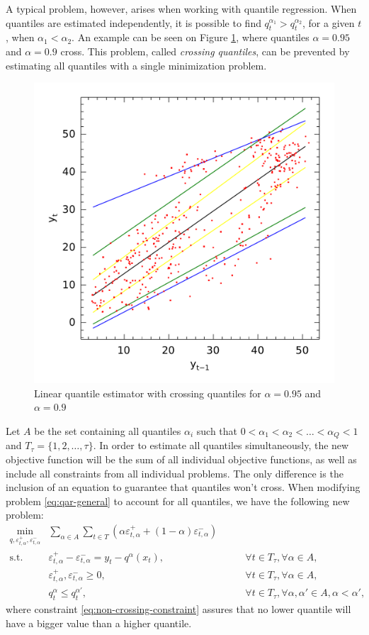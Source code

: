 A typical problem, however, arises when working with quantile regression. When quantiles are estimated independently, it is possible to find $q^{\alpha_1}_{t} > q^{\alpha_2}_{t}$, for a given $t$, when $\alpha_1 < \alpha_2$. An example can be seen on Figure \ref{fig:crossing-quantiles}, where quantiles $\alpha = 0.95$ and $\alpha = 0.9$ cross. This problem, called \textit{crossing quantiles}, can be prevented by estimating all quantiles with a single minimization problem.
\begin{figure}
	\centering
	\includegraphics[width=0.6\linewidth]{./Figuras/npqar/icaraizinho-crossing-200}
	\caption{Linear quantile estimator with crossing quantiles for $\alpha = 0.95$ and $\alpha = 0.9$}
	\label{fig:crossing-quantiles}
\end{figure}

Let $A$ be the set containing all quantiles $\alpha_i$ such that $0 < \alpha_1 < \alpha_2 < \dots < \alpha_Q < 1$ and $T_\tau = \{1, 2, \dots, \tau\}$. In order to estimate all quantiles simultaneously, the new objective function will be the sum of all individual objective functions, as well as include all constraints from all individual problems. The only difference is the inclusion of an equation to guarantee that quantiles won't cross. When modifying problem \ref{eq:qar-general} to account for all quantiles, we have the following new problem:
\begin{eqnarray}
\label{eq:non-crossing-quantiles1}
\min_{q,\varepsilon_{t,\alpha}^{+}, \varepsilon_{t,\alpha}^{-}} &  \sum_{\alpha \in A} \sum_{t \in T}\left(\alpha \varepsilon_{t,\alpha}^{+}+(1-\alpha)\varepsilon_{t,\alpha}^{-}\right) &  \\
\mbox{s.t. } & \varepsilon_{t,\alpha}^{+}-\varepsilon_{t,\alpha}^{-}=y_{t}-q^\alpha(x_{t}), & \qquad\forall t \in T_\tau,\forall \alpha \in A,\\
& \varepsilon_{t,\alpha}^+,\varepsilon_{t,\alpha}^- \geq 0, & \qquad\forall t \in T_\tau,\forall \alpha \in A,\\\label{eq:non-crossing-constraint}
& q_t^{\alpha} \leq q_t^{\alpha'}, & \qquad \forall t \in T_\tau, \forall \alpha, \alpha' \in A, \alpha < \alpha', 
\end{eqnarray}
where constraint \ref{eq:non-crossing-constraint} assures that no lower quantile will have a bigger value than a higher quantile. 



